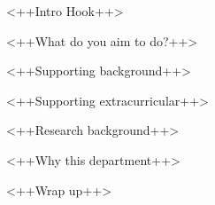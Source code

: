 \documentclass[12pt,a4paper]{article}
\begin{document}
\noindent
<++Intro Hook++>

<++What do you aim to do?++>

<++Supporting background++>

<++Supporting extracurricular++>

<++Research background++>

<++Why this department++>

<++Wrap up++>
\end{document}
